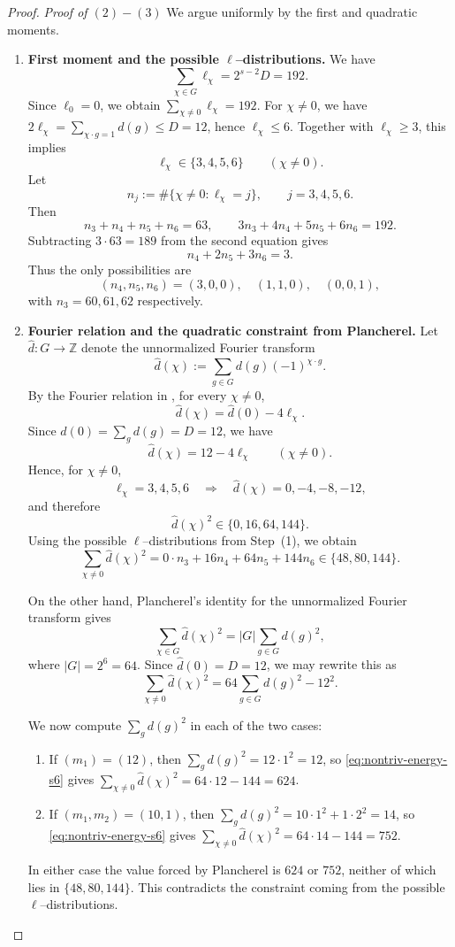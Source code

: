 \documentclass[12pt,twoside,]{amsart}
\theoremstyle{plain}
\theoremstyle{definition}
\begin{document}
\begin{proof}
\noindent\textit{Proof of $(2)-(3)$}
We argue uniformly by the first and quadratic moments.

\begin{enumerate}
\item \textbf{First moment and the possible $\ell$--distributions.}
We have
\[
\sum_{\chi\in G}\ell_\chi = 2^{s-2}D = 192.
\]
Since $\ell_0=0$, we obtain $\sum_{\chi\neq 0}\ell_\chi=192$.
For $\chi\neq 0$, we have $2\ell_\chi=\sum_{\chi\cdot g=1} d(g)\le D=12$, hence
$\ell_\chi\le 6$. Together with $\ell_\chi\ge 3$, this implies
\[
\ell_\chi\in\{3,4,5,6\}\qquad(\chi\neq 0).
\]
Let
\[
n_j:=\#\{\chi\neq 0:\ell_\chi=j\},\qquad j=3,4,5,6.
\]
Then
\[
n_3+n_4+n_5+n_6=63,
\qquad
3n_3+4n_4+5n_5+6n_6=192.
\]
Subtracting $3\cdot 63=189$ from the second equation gives
\[
n_4+2n_5+3n_6=3.
\]
Thus the only possibilities are
\[
(n_4,n_5,n_6)=(3,0,0),\quad (1,1,0),\quad (0,0,1),
\]
with $n_3=60,61,62$ respectively.

\item \textbf{Fourier relation and the quadratic constraint from Plancherel.}
Let $\widehat d:G\to\mathbb Z$ denote the unnormalized Fourier transform
\[
\widehat d(\chi):=\sum_{g\in G} d(g)(-1)^{\chi\cdot g}.
\]
By the Fourier relation in , for every $\chi\neq 0$,
\[
\widehat d(\chi)=\widehat d(0)-4\ell_\chi.
\]
Since $\widehat d(0)=\sum_g d(g)=D=12$, we have
\[
\widehat d(\chi)=12-4\ell_\chi
\qquad (\chi\neq 0).
\]
Hence, for $\chi\neq 0$,
\[
\ell_\chi=3,4,5,6 \quad\Longrightarrow\quad
\widehat d(\chi)=0,-4,-8,-12,
\]
and therefore
\[
\widehat d(\chi)^2\in\{0,16,64,144\}.
\]
Using the possible $\ell$--distributions from Step~(1), we obtain
\[
\sum_{\chi\neq 0}\widehat d(\chi)^2
=
0\cdot n_3 + 16n_4 + 64n_5 + 144n_6
\in\{48,80,144\}.
\]

On the other hand, Plancherel's identity for the unnormalized Fourier transform gives
\[
\sum_{\chi\in G}\widehat d(\chi)^2
=
|G|\sum_{g\in G} d(g)^2,
\]
where $|G|=2^6=64$. Since $\widehat d(0)=D=12$, we may rewrite this as
\begin{equation}\label{eq:nontriv-energy-s6}
\sum_{\chi\neq 0}\widehat d(\chi)^2
=
64\sum_{g\in G} d(g)^2 - 12^2.
\end{equation}

We now compute $\sum_g d(g)^2$ in each of the two cases:

\begin{enumerate}
\item If $(m_1)=(12)$, then $\sum_g d(g)^2 = 12\cdot 1^2 = 12$,
so \eqref{eq:nontriv-energy-s6} gives $\sum_{\chi\neq 0}\widehat d(\chi)^2=64\cdot12-144=624$.
\item If $(m_1,m_2)=(10,1)$, then $\sum_g d(g)^2 = 10\cdot 1^2 + 1\cdot 2^2=14$,
so \eqref{eq:nontriv-energy-s6} gives $\sum_{\chi\neq 0}\widehat d(\chi)^2=64\cdot14-144=752$.
\end{enumerate}
In either case the value forced by Plancherel is $624$ or $752$, neither of which lies
in $\{48,80,144\}$. This contradicts the constraint coming from the possible
$\ell$--distributions.


\end{enumerate}
\end{proof}
\end{document}
